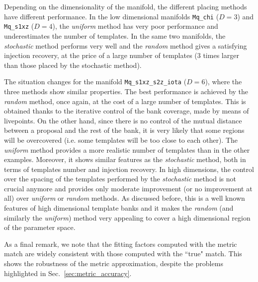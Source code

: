 \documentclass[twocolumn,showpacs,preprintnumbers,nofootinbib,prd,
superscriptaddress,10pt]{revtex4-2}
\begin{document}
Depending on the dimensionality of the manifold, the different placing methods have different performance.
In the low dimensional manifolds \texttt{Mq\_chi} ($D=3$) and \texttt{Mq\_s1xz} ($D=4$), the {\it uniform} method has very poor performance and underestimates the number of templates. In the same two manifolds, the {\it stochastic} method performs very well and the {\it random} method gives a satisfying injection recovery, at the price of a large number of templates (3 times larger than those placed by the stochastic method).

The situation changes for the manifold \texttt{Mq\_s1xz\_s2z\_iota} ($D=6$), where the three methods show similar properties. The best performance is achieved by the {\it random} method, once again, at the cost of a large number of templates.
This is obtained thanks to the iterative control of the bank coverage, made by means of livepoints. On the other hand, since there is no control of the mutual distance between a proposal and the rest of the bank, it is very likely that some regions will be overcovered (i.e. some templates will be too close to each other).
The {\it uniform} method provides a more realistic number of templates than in the other examples. Moreover, it shows similar features as the {\it stochastic} method, both in terms of templates number and injection recovery.
In high dimensions, the control over the spacing of the templates performed by the {\it stochastic} method is not crucial anymore and provides only moderate improvement (or no improvement at all) over {\it uniform} or {\it random} methods. As discussed before, this is a well known features \cite{Messenger:2008ta, Allen:2021yuy, Allen:2022lqr} of high dimensional template banks and it makes the {\it random} (and similarly the {\it uniform}) method very appealing to cover a high dimensional region of the parameter space.

As a final remark, we note that the fitting factors computed with the metric match are widely consistent with those computed with the ``true" match. This shows the robustness of the metric approximation, despite the problems highlighted in Sec.~\ref{sec:metric_accuracy}.

\end{document}

